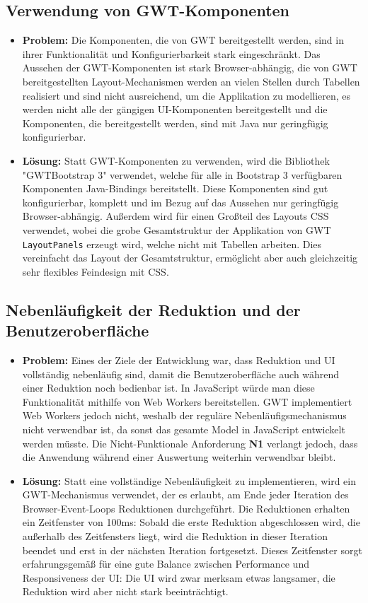 \documentclass[parskip=full,11pt]{scrartcl}
\begin{document}
\subsection{Verwendung von GWT-Komponenten}
\begin{itemize}
\item[] \textbf{Problem:}
Die Komponenten, die von GWT bereitgestellt werden, sind in ihrer Funktionalität und Konfigurierbarkeit stark eingeschränkt.
Das Aussehen der GWT-Kom\-po\-nen\-ten ist stark Browser-abhängig, die von GWT bereitgestellten Layout-Mechanismen werden an vielen Stellen durch Tabellen realisiert und sind nicht ausreichend, um die Applikation zu modellieren, es werden nicht alle der gängigen UI-Komponenten bereitgestellt und die Komponenten, die bereitgestellt werden, sind mit Java nur geringfügig konfigurierbar.
\item[] \textbf{Lösung:}
Statt GWT-Komponenten zu verwenden, wird die Bibliothek "GWTBootstrap 3" verwendet, welche für alle in Bootstrap 3 verfügbaren Komponenten Java-Bindings bereitstellt. Diese Komponenten sind gut konfigurierbar, komplett und im Bezug auf das Aussehen nur geringfügig Browser-abhängig. Außerdem wird für einen Großteil des Layouts CSS verwendet, wobei die grobe Gesamtstruktur der Applikation von GWT \texttt{LayoutPanels} erzeugt wird, welche nicht mit Tabellen arbeiten. Dies vereinfacht das Layout der Gesamtstruktur, ermöglicht aber auch gleichzeitig sehr flexibles Feindesign mit CSS.
\end{itemize}

\subsection{Nebenläufigkeit der Reduktion und der Benutzeroberfläche}
\begin{itemize}
\item[] \textbf{Problem:}
Eines der Ziele der Entwicklung war, dass Reduktion und UI vollständig nebenläufig sind, damit die Benutzeroberfläche auch während einer Reduktion noch bedienbar ist.
In JavaScript würde man diese Funktionalität mithilfe von Web Workers bereitstellen.
GWT implementiert Web Workers jedoch nicht, weshalb der reguläre Nebenläufigsmechanismus nicht verwendbar ist, da sonst das gesamte Model in JavaScript entwickelt werden müsste.
Die Nicht-Funktionale Anforderung \textbf{N1} verlangt jedoch, dass die Anwendung während einer Auswertung weiterhin verwendbar bleibt.
\item[] \textbf{Lösung:}
Statt eine vollständige Nebenläufigkeit zu implementieren, wird ein GWT-Mechanismus verwendet, der es erlaubt, am Ende jeder Iteration des Browser-Event-Loops Reduktionen durchgeführt.
Die Reduktionen erhalten ein Zeitfenster von 100ms: Sobald die erste Reduktion abgeschlossen wird, die außerhalb des Zeitfensters liegt, wird die Reduktion in dieser Iteration beendet und erst in der nächsten Iteration fortgesetzt.
Dieses Zeitfenster sorgt erfahrungsgemäß für eine gute Balance zwischen Performance und Responsiveness der UI: Die UI wird zwar merksam etwas langsamer, die Reduktion wird aber nicht stark beeinträchtigt.
\end{itemize}
\end{document}
